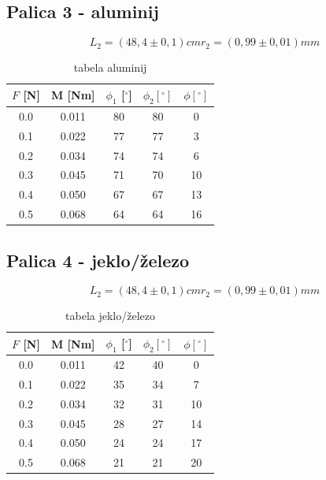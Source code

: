 \documentclass[11pt]{article}
\begin{document}
    \subsection{Palica 3 - aluminij}
    \[
        L_2 = (48,4 \pm 0,1) cm
        r_2 = (0,99 \pm 0,01) mm
    \]
    \begin{table}[H]
        \centering
        \begin{tabular}{|c|c|c|c|c|}
            \hline
            $F$ [N] & M [Nm] & $\phi_1$ [$^\circ$] & $\phi_2 [^\circ]$ & $  \phi [^\circ]$\\
            \hline
            0.0  & 0.011 & 80  & 80 & 0 \\
            0.1  & 0.022 & 77  & 77 & 3 \\
            0.2  & 0.034 & 74  & 74 & 6 \\
            0.3  & 0.045 & 71  & 70 & 10 \\
            0.4  & 0.050 & 67  & 67 & 13 \\
            0.5  & 0.068 & 64  & 64 & 16 \\
            \hline
        \end{tabular}
        \caption{tabela aluminij}
        \label{tab:aluminij}
    \end{table}

    \subsection{Palica 4 - jeklo/železo}
    \[
        L_2 = (48,4 \pm 0,1) cm
        r_2 = (0,99 \pm 0,01) mm
    \]
    \begin{table}[H]
        \centering
        \begin{tabular}{|c|c|c|c|c|}
            \hline
            $F$ [N] & M [Nm] & $\phi_1$ [$^\circ$] & $\phi_2 [^\circ]$ & $  \phi [^\circ]$\\
            \hline
            0.0  & 0.011 & 42  & 40 & 0 \\
            0.1  & 0.022 & 35  & 34 & 7 \\
            0.2  & 0.034 & 32  & 31 & 10 \\
            0.3  & 0.045 & 28  & 27 & 14 \\
            0.4  & 0.050 & 24  & 24 & 17 \\
            0.5  & 0.068 & 21  & 21 & 20 \\
            \hline
        \end{tabular}
        \caption{tabela jeklo/železo}
        \label{tab:jeklo/železo}
    \end{table}
\end{document}
